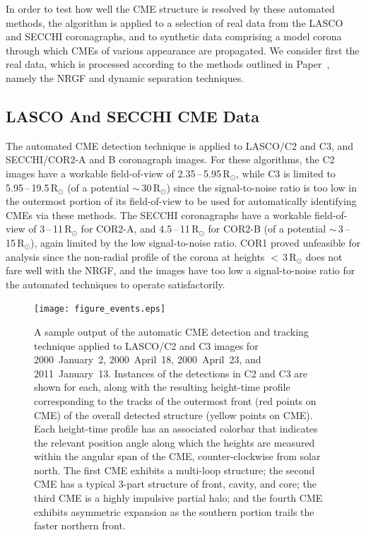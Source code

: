 \documentclass[preprint2]{aastex}
\newcommand{\RNum}[1]{\uppercase\expandafter{\romannumeral #1\relax}}
\begin{document}
In order to test how well the CME structure is resolved by these automated methods, the algorithm is applied to a selection of real data from the LASCO and SECCHI coronagraphs, and to synthetic data comprising a model corona through which CMEs of various appearance are propagated. We consider first the real data, which is processed according to the methods outlined in Paper~\RNum{1}, namely the NRGF and dynamic separation techniques.


\subsection{LASCO And SECCHI CME Data}
\label{subsect_data}

The automated CME detection technique is applied to LASCO/C2 and C3, and SECCHI/COR2-A and B coronagraph images. For these algorithms, the C2 images have a workable field-of-view of 2.35\,--\,5.95\,R$_{\odot}$, while C3 is limited to 5.95\,--\,19.5\,R$_{\odot}$  (of a potential $\sim$\,30\,R$_{\odot}$) since the signal-to-noise ratio is too low in the outermost portion of its field-of-view to be used for automatically identifying CMEs via these methods. The SECCHI coronagraphs have a workable field-of-view of 3\,--\,11\,R$_{\odot}$ for COR2-A, and 4.5\,--\,11\,R$_{\odot}$ for COR2-B (of a potential $\sim$\,3\,--\,15\,R$_{\odot}$), again limited by the low signal-to-noise ratio. COR1 proved unfeasible for analysis since the non-radial profile of the corona at heights $<$\,3\,R$_\odot$ does not fare well with the NRGF, and the images have too low a signal-to-noise ratio for the automated techniques to operate satisfactorily.

\begin{figure}[!t]
\centerline{\texttt{[image: figure\_events.eps]}}
\caption{A sample output of the automatic CME detection and tracking technique applied to LASCO/C2 and C3 images for 2000~January~2, 2000~April~18, 2000~April~23, and 2011~January~13. Instances of the detections in C2 and C3 are shown for each, along with the resulting height-time profile corresponding to the tracks of the outermost front (red points on CME) of the overall detected structure (yellow points on CME). Each height-time profile has an associated colorbar that indicates the relevant position angle along which the heights are measured within the angular span of the CME, counter-clockwise from solar north. The first CME exhibits a multi-loop structure; the second CME has a typical 3-part structure of front, cavity, and core; the third CME is a highly impulsive partial halo; and the fourth CME exhibits asymmetric expansion as the southern portion trails the faster northern front.}
\label{figure_events}
\end{figure}
\end{document}
